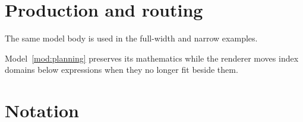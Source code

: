 \documentclass[twocolumn]{article}
\begin{document}
\section*{Production and routing}
The same model body is used in the full-width and narrow examples.

Model~\eqref{mod:planning} preserves its mathematics while the renderer
moves index domains below expressions when they no longer fit beside them.
\section*{Notation}

\end{document}
